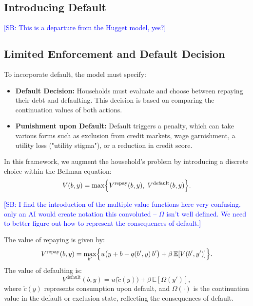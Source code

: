 \documentclass[acmsmall]{acmart}
\newcommand{\spb}[1]{\textcolor{blue}{[SB: #1]}}
\begin{document}
\subsection{Introducing Default}

\spb{This is a departure from the Hugget model, yes?}

\subsection*{Limited Enforcement and Default Decision}

To incorporate default, the model must specify:

\begin{itemize}
    \item \textbf{Default Decision:} Households must evaluate and choose between repaying their debt and defaulting. This decision is based on comparing the continuation values of both actions.
    \item \textbf{Punishment upon Default:} Default triggers a penalty, which can take various forms such as exclusion from credit markets, wage garnishment, a utility loss ("utility stigma"), or a reduction in credit score.
\end{itemize}

In this framework, we augment the household's problem by introducing a discrete choice within the Bellman equation:
\begin{equation}
V(b, y) = \max \Bigl\{V^\text{repay}(b,y), \;V^\text{default}(b,y)\Bigr\}.
\end{equation}

\spb{I find the introduction of the multiple value functions here very confusing. only an AI would create notation this convoluted -- $\Omega$ isn't well defined. We need to better figure out how to represent the consequences of default.}

The value of repaying is given by:
\begin{equation}
V^\text{repay}(b,y) = \max_{b'} \Bigl\{
    u\bigl(y + b - q(b',y)\,b'\bigr)
    + \beta \,\mathbb{E}[V(b',y')]
  \Bigr\}.
\end{equation}
The value of defaulting is:
\begin{equation}
V^\text{default}(b,y) = u\bigl(\tilde{c}(y)\bigr) + \beta \,\mathbb{E}[\Omega(y')],
\end{equation}
where $\tilde{c}(y)$ represents consumption upon default, and $\Omega(\cdot)$ is the continuation value in the default or exclusion state, reflecting the consequences of default.
\end{document}
